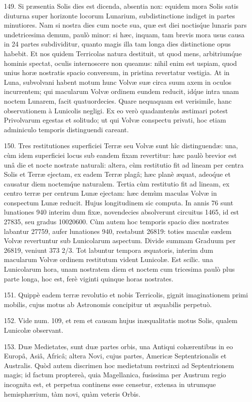 \documentclass[a4paper, 11pt, oneside, polutonikogreek, german]{article}
\begin{document}
149. Si præsentia Solis dies est dicenda, absentia nox: equidem mora Solis satis diuturna super horizonte locorum Lunarium, subdistinctione indiget in partes minutiores. Nam si nostra dies cum nocte sua, quæ est diei noctis\'que lunaris pars undetricesima demum, paulò minor: si hæc, inquam, tam brevis mora usus causa in 24 partes subdividitur, quanto magis illa tam longa dies distinctione opus habebit. Et nos quidem Terricolas natura destituit, ut quod mens, arbitrium\'que hominis spectat, oculis internoscere non queamus: nihil enim est uspiam, quod unius horæ nostratis spacio conversum, in pristina revertatur vestigia. At in Luna, subvolvani habent motum hunc Volvæ suæ circa suum axem in oculos incurrentem; qui macularum Volvæ ordinem eundem reducit, id\'que intra unam noctem Lunarem, facit quatuordecies. Quare nequaquam est verisimile, hanc observationem à Lunicolis negligi. Ex eo verò quadamtenùs æstimari potest Privolvarum egestas et solitudo; ut qui Volvæ conspectu privati, hoc etiam adminiculo temporis distinguendi careant.

150. Tres restitutiones superficiei Terræ seu Volvæ sunt hîc distinguendæ: una, cùm idem superficiei locus sub eandem fixam revertitur: hæc paulò brevior est unâ die et nocte nostrate naturali: altera, cùm restitutio fit ad lineam per centra Solis et Terræ ejectam, ex eadem Terræ plagâ; hæc planè æquat, adeo\'que et causatur diem noctem\'que naturalem. Tertia cùm restitutio fit ad lineam, ex centro terræ per centrum Lunæ ejectam: hæc demùm maculas Volvæ in conspectum Lunæ reducit. Hujus longitudinem sic computa. In annis 76 sunt lunationes 940 interim dum fixæ, novendecies absolverunt circuitus 1465, id est 27835, seu gradus 10020600. Cùm autem hoc temporis spacio dies nostrates labantur 27759, aufer lunationes 940, restabunt 26819: toties maculæ eædem Volvæ revertuntur sub Lunicolarum aspectum. Divide summam Graduum per 26819, veniunt 373 2/3. Tot labuntur tempora æquatoris, interim dum macularum Volvæ ordinem restitutum vident Lunicolæ. Est scilic. una Lunicolarum hora, unam nostratem diem et noctem cum tricesima paulò plus parte longa, hoc est, ferè viginti quinque horas nostrates.

151. Quippè eadem terræ revolutio et nobis Terricolis, gignit imaginationem primi mobilis, cujus motus ab Astronomis concipitur ut æquabilis perpetuò.

152. Vide num. 109, et rem et causam hujus inæqualitatis motus Solis, qualem Lunicolæ observant.

153. Duæ Medietates, sunt duæ partes orbis, una Antiqui cohærentibus in eo Europâ, Asiâ, Africâ; altera Novi, cujus partes, Americæ Septentrionalis et Australis. Quòd autem discrimen hoc medietatum restrinxi ad Septentrionem magis; id factum proptereà, quia Magellanica, fusissima per Austrum regio incognita est, et perpetua continens esse censetur, extensa in utrumque hemisphærium, tàm novi, quàm veteris Orbis.
\end{document}
